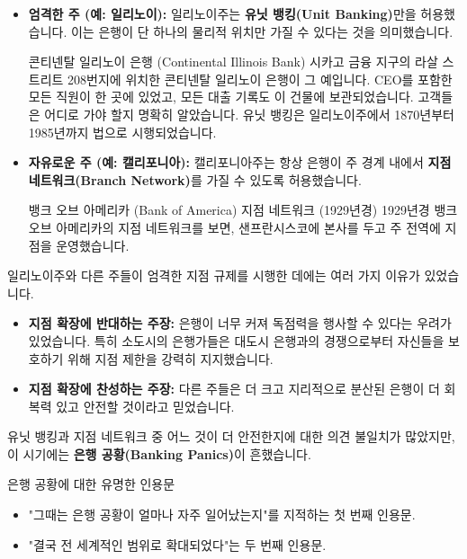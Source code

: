 \documentclass[11pt,a4paper]{article}
\begin{document}
\begin{itemize}
    \item \textbf{엄격한 주 (예: 일리노이):} 일리노이주는 \textbf{유닛 뱅킹(Unit Banking)}만을 허용했습니다. 이는 은행이 단 하나의 물리적 위치만 가질 수 있다는 것을 의미했습니다.
    \begin{examplebox}{콘티넨탈 일리노이 은행 (Continental Illinois Bank)}
    시카고 금융 지구의 라살 스트리트 208번지에 위치한 콘티넨탈 일리노이 은행이 그 예입니다. CEO를 포함한 모든 직원이 한 곳에 있었고, 모든 대출 기록도 이 건물에 보관되었습니다. 고객들은 어디로 가야 할지 명확히 알았습니다. 유닛 뱅킹은 일리노이주에서 1870년부터 1985년까지 법으로 시행되었습니다.
    \end{examplebox}
    \item \textbf{자유로운 주 (예: 캘리포니아):} 캘리포니아주는 항상 은행이 주 경계 내에서 \textbf{지점 네트워크(Branch Network)}를 가질 수 있도록 허용했습니다.
    \begin{examplebox}{뱅크 오브 아메리카 (Bank of America) 지점 네트워크 (1929년경)}
    1929년경 뱅크 오브 아메리카의 지점 네트워크를 보면, 샌프란시스코에 본사를 두고 주 전역에 지점을 운영했습니다.
    \end{examplebox}
\end{itemize}

일리노이주와 다른 주들이 엄격한 지점 규제를 시행한 데에는 여러 가지 이유가 있었습니다.
\begin{itemize}
    \item \textbf{지점 확장에 반대하는 주장:} 은행이 너무 커져 독점력을 행사할 수 있다는 우려가 있었습니다. 특히 소도시의 은행가들은 대도시 은행과의 경쟁으로부터 자신들을 보호하기 위해 지점 제한을 강력히 지지했습니다.
    \item \textbf{지점 확장에 찬성하는 주장:} 다른 주들은 더 크고 지리적으로 분산된 은행이 더 회복력 있고 안전할 것이라고 믿었습니다.
\end{itemize}
유닛 뱅킹과 지점 네트워크 중 어느 것이 더 안전한지에 대한 의견 불일치가 많았지만, 이 시기에는 \textbf{은행 공황(Banking Panics)}이 흔했습니다.

\begin{examplebox}{은행 공황에 대한 유명한 인용문}
\begin{itemize}
    \item "그때는 은행 공황이 얼마나 자주 일어났는지"를 지적하는 첫 번째 인용문.
    \item "결국 전 세계적인 범위로 확대되었다"는 두 번째 인용문.
\end{itemize}
\end{examplebox}
\end{document}
